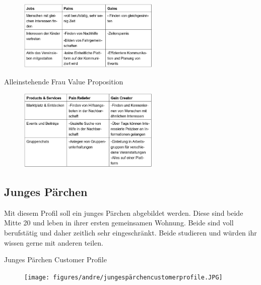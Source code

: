\begin{figure}[H]
    \centering
    \includegraphics[width=0.6\textwidth]{figures/andre/alleinstehendecustomerprofile.JPG}
    \label{fig:alleinstehendecustomerprofile}
\end{figure}

\begin{table}[H]
    \centering
    \caption{Alleinstehende Frau Value Proposition}
\end{table}

\begin{figure}[H]
    \centering
    \includegraphics[width=0.6\textwidth]{figures/andre/alleinstehendevalueproposition.JPG}
    \label{fig:alleinstehendevalueproposition}
\end{figure}

\subsection*{Junges Pärchen}
Mit diesem Profil soll ein junges Pärchen abgebildet werden. Diese sind beide Mitte 20 und leben in ihrer ersten gemeinsamen Wohnung. Beide sind voll berufstätig und daher zeitlich sehr eingeschränkt. Beide studieren und würden ihr wissen gerne mit anderen teilen.

\begin{table}[H]
    \centering
    \caption{Junges Pärchen Customer Profile}
\end{table}

\begin{figure}[H]
    \centering
    \texttt{[image: figures/andre/jungespärchencustomerprofile.JPG]}
    \label{fig:jungespärchencustomerprofile}
\end{figure}

